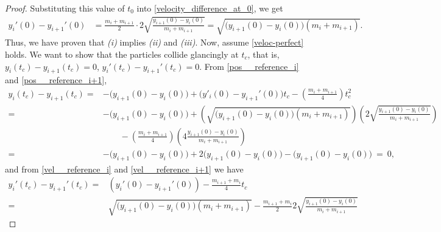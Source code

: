 \documentclass[10pt,a4paper]{amsart}
\begin{document}
\begin{proof}
            Substituting this value of $t_0$ into \eqref{velocity_difference_at_0}, we get
            \begin{align*}
                y_i'(0) - y_{i+1}'(0) &= \frac{m_i + m_{i+1}}{2} \cdot 2\sqrt{\frac{y_{i+1}(0) - y_i(0)}{m_i + m_{i+1}}} = \sqrt{\big( y_{i+1}(0) - y_i(0) \big) \left(m_i + m_{i+1} \right)}.
            \end{align*}
            Thus, we have proven that \emph{(i)} implies \emph{(ii)} and \emph{(iii)}. Now, assume \eqref{veloc-perfect} holds.
            We want to show that the particles collide glancingly at $t_c$, that is, $y_i(t_c) - y_{i + 1}(t_c) = 0$, $y_i'(t_c) - y_{i + 1}'(t_c) = 0$. From \eqref{pos__reference_i} and \eqref{pos__reference_i+1}, 
            \begin{align*}
                y_i(t_c) - y_{i + 1}(t_c) 
                =& -\big( y_{i+1}(0) - y_i(0) \big) + \big( y'_i(0) - y_{i+1}'(0)\big) t_c - \left( \frac{m_i + m_{i+1}}{4} \right) t_c^2 \\
                =& -\big( y_{i+1}(0) - y_i(0) \big) + \left( \sqrt{\big( y_{i+1}(0) - y_i(0) \big) \left(m_i + m_{i+1} \right)} \right) \left( 2\sqrt{\frac{y_{i+1}(0) - y_i(0)}{m_i + m_{i+1}}} \right)  \\ 
                &\quad\quad - \left( \frac{m_i + m_{i+1}}{4} \right) \left( 4 \frac{y_{i+1}(0) - y_i(0)}{m_i + m_{i+1}} \right) \nonumber \\
                =& -\big( y_{i+1}(0) - y_i(0) \big) + 2 \big( y_{i+1}(0) - y_{i}(0) \big) - \big( y_{i+1}(0) - y_{i}(0) \big)\ = \ 0,
            \end{align*}
            and from \eqref{vel__reference_i} and \eqref{vel__reference_i+1} we have
            \begin{align*}
                y_i'(t_c) - y_{i + 1}'(t_c) 
                =& \left( y_i'(0) - y_{i+1}'(0) \right) - \frac{m_{i+1} + m_i}{4} t_c \\
                =& \sqrt{\big( y_{i+1}(0) - y_i(0) \big) \left(m_i + m_{i+1} \right)} - \frac{m_{i+1} + m_i}{2} 2\sqrt{\frac{y_{i+1}(0) - y_i(0)}{m_i + m_{i+1}}} 

\end{align*}
\end{proof}
\end{document}
